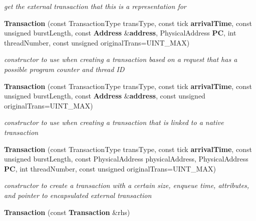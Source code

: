 \begin{DoxyCompactItemize}
\begin{DoxyCompactList}\small\item\em get the external transaction that this is a representation for \item\end{DoxyCompactList}\item 
{\bf Transaction} (const TransactionType transType, const tick {\bf arrivalTime}, const unsigned burstLength, const {\bf Address} \&{\bf address}, PhysicalAddress {\bf PC}, int threadNumber, const unsigned originalTrans=UINT\_\-MAX)\label{class_d_r_a_msim_i_i_1_1_transaction_a5c1c99a53ce9d4a799f245268d2dc537}

\begin{DoxyCompactList}\small\item\em constructor to use when creating a transaction based on a request that has a possible program counter and thread ID \item\end{DoxyCompactList}\item 
{\bf Transaction} (const TransactionType transType, const tick {\bf arrivalTime}, const unsigned burstLength, const {\bf Address} \&{\bf address}, const unsigned originalTrans=UINT\_\-MAX)\label{class_d_r_a_msim_i_i_1_1_transaction_afbd63f694ace99a07fa448160507064f}

\begin{DoxyCompactList}\small\item\em constructor to use when creating a transaction that is linked to a native transaction \item\end{DoxyCompactList}\item 
{\bf Transaction} (const TransactionType transType, const tick {\bf arrivalTime}, const unsigned burstLength, const PhysicalAddress physicalAddress, PhysicalAddress {\bf PC}, int threadNumber, const unsigned originalTrans=UINT\_\-MAX)\label{class_d_r_a_msim_i_i_1_1_transaction_ad01bf6da8c4f48a704fd0ba444a4475c}

\begin{DoxyCompactList}\small\item\em constructor to create a transaction with a certain size, enqueue time, attributes, and pointer to encapsulated external transaction \item\end{DoxyCompactList}\item 
{\bf Transaction} (const {\bf Transaction} \&rhs)\label{class_d_r_a_msim_i_i_1_1_transaction_abf61afbd5abc7698fc59e9ee86f620a7}


\end{DoxyCompactItemize}
